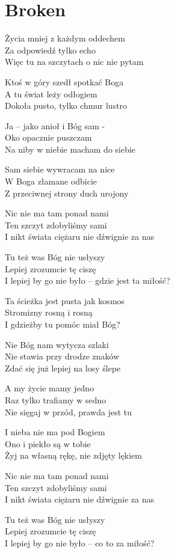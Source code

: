 \section{Broken}
\begin{text}
    Życia mniej z każdym oddechem\\
    Za odpowiedź tylko echo\\
    Więc tu na szczytach o nic nie pytam

    Ktoś w góry szedł spotkać Boga\\
    A tu świat leży odłogiem\\
    Dokoła pusto, tylko chmur lustro

    Ja – jako anioł i Bóg sam -\\
    Oko opacznie puszczam\\
    Na niby w niebie macham do siebie

    Sam siebie wywracam na nice\\
    W Boga złamane odbicie\\
    Z przeciwnej strony duch urojony

    Nic nie ma tam ponad nami\\
    Ten szczyt zdobyliśmy sami\\
    I nikt świata ciężaru nie dźwignie za nas

    Tu też was Bóg nie usłyszy\\
    Lepiej zrozumcie tę ciszę\\
    I lepiej by go nie było – gdzie jest ta miłość?

    Ta ścieżka jest pusta jak kosmos\\
    Stromizny rosną i rosną\\
    I gdzieżby tu pomóc miał Bóg?

    Nie Bóg nam wytycza szlaki\\
    Nie stawia przy drodze znaków\\
    Zdać się już lepiej na losy ślepe

    A my życie mamy jedno\\
    Raz tylko trafiamy w sedno\\
    Nie sięgaj w przód, prawda jest tu

    I nieba nie ma pod Bogiem\\
    Ono i piekło są w tobie\\
    Żyj na własną rękę, nie zdjęty lękiem

    Nic nie ma tam ponad nami\\
    Ten szczyt zdobyliśmy sami\\
    I nikt świata ciężaru nie dźwignie za nas

    Tu też was Bóg nie usłyszy\\
    Lepiej zrozumcie tę ciszę\\
    I lepiej by go nie było – co to za miłość?
\end{text}
\begin{chord}
\end{chord}